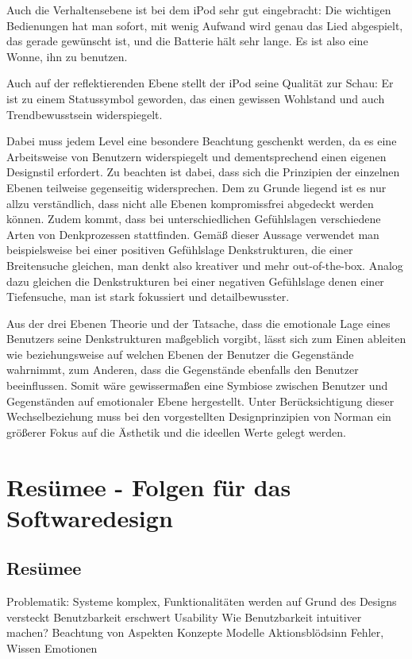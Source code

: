 \documentclass[parskip,headsepline, headtopline, %
footsepline, oneside, 12pt, headings=small]{scrreprt}
\begin{document}
Auch die Verhaltensebene ist bei dem iPod sehr gut eingebracht: Die wichtigen Bedienungen hat man sofort, mit wenig Aufwand wird genau das Lied abgespielt, das gerade gewünscht ist, und die Batterie hält sehr lange. Es ist also eine Wonne, ihn zu benutzen.

Auch auf der reflektierenden Ebene stellt der iPod seine Qualität zur Schau: Er ist zu einem Statussymbol geworden, das einen gewissen Wohlstand und auch Trendbewusstsein widerspiegelt. 


Dabei muss jedem Level eine besondere Beachtung geschenkt werden, da es eine Arbeitsweise von Benutzern widerspiegelt und dementsprechend einen eigenen Designstil erfordert. Zu beachten ist dabei, dass sich die Prinzipien der einzelnen Ebenen teilweise gegenseitig widersprechen. Dem zu Grunde liegend ist es nur allzu verständlich, dass nicht alle Ebenen kompromissfrei abgedeckt werden können. 
Zudem kommt, dass bei unterschiedlichen Gefühlslagen verschiedene Arten von Denkprozessen stattfinden. Gemäß dieser Aussage verwendet man beispielsweise bei einer positiven Gefühlslage Denkstrukturen, die einer Breitensuche gleichen, man denkt also kreativer und mehr out-of-the-box. Analog dazu gleichen die Denkstrukturen bei einer negativen Gefühlslage denen einer Tiefensuche, man ist stark fokussiert und detailbewusster.

Aus der drei Ebenen Theorie und der Tatsache, dass die emotionale Lage eines Benutzers seine Denkstrukturen maßgeblich vorgibt, lässt sich zum Einen ableiten wie beziehungsweise auf welchen Ebenen der Benutzer die Gegenstände wahrnimmt, zum Anderen, dass die Gegenstände ebenfalls den Benutzer beeinflussen. Somit wäre gewissermaßen eine Symbiose zwischen Benutzer und Gegenständen auf emotionaler Ebene hergestellt. Unter Berücksichtigung dieser Wechselbeziehung muss bei den vorgestellten Designprinzipien von Norman ein größerer Fokus auf die Ästhetik und die ideellen Werte gelegt werden.



 
\chapter{Resümee - Folgen für das Softwaredesign}
\section{Resümee}

Problematik: Systeme komplex, Funktionalitäten werden auf Grund des Designs versteckt Benutzbarkeit erschwert \textrightarrow Usability
Wie Benutzbarkeit intuitiver machen?
Beachtung von Aspekten
Konzepte Modelle
Aktionsblödsinn
Fehler, Wissen
Emotionen
\end{document}
